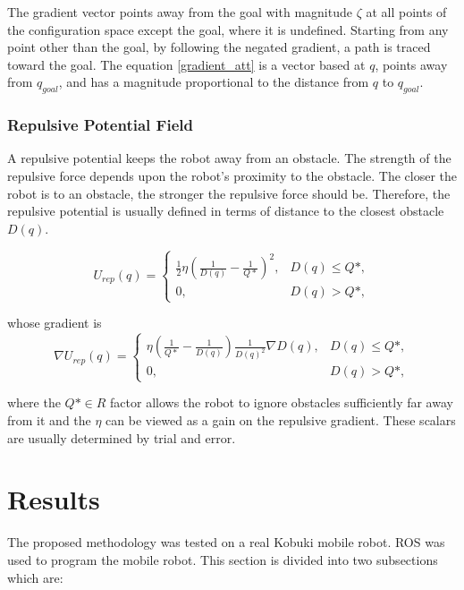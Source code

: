 \documentclass[conference]{IEEEtran}
\begin{document}
The gradient vector points away from the goal with magnitude $\zeta$ at all points of the configuration space except the goal, where it is undefined. Starting from any point other than the goal, by following the negated gradient, a path is traced toward the goal. The equation \ref{gradient_att} is a vector based at $q$, points away from $q_{goal}$, and has a magnitude proportional to the distance from $q$ to $q_{goal}$.\\

\subsubsection{\textbf{Repulsive Potential Field}}

A repulsive potential keeps the robot away from an obstacle. The strength of the repulsive force depends upon the robot's proximity to the obstacle. The closer the robot is to an obstacle, the stronger the repulsive force should be. Therefore, the repulsive potential is usually defined in terms of distance to the closest obstacle $D(q)$.

\begin{equation}
	U_{rep}(q) = 
		\begin{cases}
			\frac{1}{2}\eta(\frac{1}{D(q)} - \frac{1}{Q*})^2, & D(q)\leq Q*, \\
			0, & D(q) > Q*,
		\end{cases}
	\label{eq:pot_rep}
\end{equation}

whose gradient is
\begin{equation}
	\nabla U_{rep}(q) = 
		\begin{cases}
			\eta (\frac{1}{Q*} - \frac{1}{D(q)})\frac{1}{D(q)^2} \nabla D(q), &D(q) \leq Q*,\\
			0 , &D(q) > Q*,
		\end{cases}
	\label{eq:force_rep}
\end{equation}

where the $Q* \in R $ factor allows the robot to ignore obstacles sufficiently far away from it and the $\eta$ can be viewed as a gain on the repulsive gradient. These scalars are usually determined by trial and error.


\section{Results}
The proposed methodology was tested on a real Kobuki mobile robot. ROS was used to program the mobile robot. This section is divided into two subsections which are:
\end{document}
